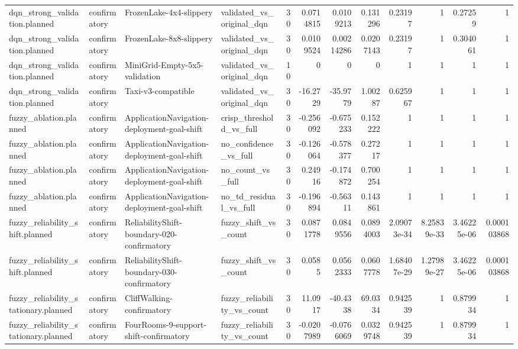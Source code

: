 \begin{longtable}{llllrrrrrrrr}
dqn\_strong\_validation.planned & confirmatory & FrozenLake-4x4-slippery & validated\_vs\_original\_dqn & 30 & 0.0714815 & 0.0109213 & 0.131296 & 0.23197 & 1 & 0.27259 & 1 \\
dqn\_strong\_validation.planned & confirmatory & FrozenLake-8x8-slippery & validated\_vs\_original\_dqn & 30 & 0.0109524 & 0.00214286 & 0.0207143 & 0.23197 & 1 & 0.304061 & 1 \\
dqn\_strong\_validation.planned & confirmatory & MiniGrid-Empty-5x5-validation & validated\_vs\_original\_dqn & 10 & 0 & 0 & 0 & 1 & 1 & 1 & 1 \\
dqn\_strong\_validation.planned & confirmatory & Taxi-v3-compatible & validated\_vs\_original\_dqn & 30 & -16.2729 & -35.9779 & 1.00287 & 0.625967 & 1 & 1 & 1 \\
fuzzy\_ablation.planned & confirmatory & ApplicationNavigation-deployment-goal-shift & crisp\_threshold\_vs\_full & 30 & -0.256092 & -0.675233 & 0.152222 & 1 & 1 & 1 & 1 \\
fuzzy\_ablation.planned & confirmatory & ApplicationNavigation-deployment-goal-shift & no\_confidence\_vs\_full & 30 & -0.126064 & -0.578377 & 0.27217 & 1 & 1 & 1 & 1 \\
fuzzy\_ablation.planned & confirmatory & ApplicationNavigation-deployment-goal-shift & no\_count\_vs\_full & 30 & 0.24916 & -0.174872 & 0.700254 & 1 & 1 & 1 & 1 \\
fuzzy\_ablation.planned & confirmatory & ApplicationNavigation-deployment-goal-shift & no\_td\_residual\_vs\_full & 30 & -0.196894 & -0.56311 & 0.143861 & 1 & 1 & 1 & 1 \\
fuzzy\_reliability\_shift.planned & confirmatory & ReliabilityShift-boundary-020-confirmatory & fuzzy\_shift\_vs\_count & 30 & 0.0871778 & 0.0849556 & 0.0894003 & 2.09073e-34 & 8.25839e-33 & 3.46225e-06 & 0.000103868 \\
fuzzy\_reliability\_shift.planned & confirmatory & ReliabilityShift-boundary-030-confirmatory & fuzzy\_shift\_vs\_count & 30 & 0.0585 & 0.0562333 & 0.0607778 & 1.68407e-29 & 1.27989e-27 & 3.46225e-06 & 0.000103868 \\
fuzzy\_reliability\_stationary.planned & confirmatory & CliffWalking-confirmatory & fuzzy\_reliability\_vs\_count & 30 & 11.0917 & -40.4338 & 69.0334 & 0.942539 & 1 & 0.879934 & 1 \\
fuzzy\_reliability\_stationary.planned & confirmatory & FourRooms-9-support-shift-confirmatory & fuzzy\_reliability\_vs\_count & 30 & -0.0207989 & -0.0766069 & 0.0329748 & 0.942539 & 1 & 0.879934 & 1 \\

\end{longtable}
